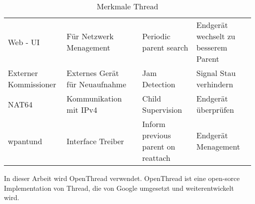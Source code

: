\begin{table}[H]
\begin{adjustbox}{width=1\textwidth}
\begin{tabular}{@{}lllll@{}}
		\multicolumn{1}{|l|}{Web - UI}              & \multicolumn{1}{l|}{Für Netzwerk Menagement}           & \multicolumn{1}{l|}{} & \multicolumn{1}{l|}{Periodic parent search}             & \multicolumn{1}{l|}{Endgerät wechselt zu besserem Parent} \\ \cmidrule(r){1-2} \cmidrule(l){4-5} 
		\multicolumn{1}{|l|}{Externer Kommissioner} & \multicolumn{1}{l|}{Externes Gerät für Neuaufnahme}    & \multicolumn{1}{l|}{} & \multicolumn{1}{l|}{Jam Detection}                      & \multicolumn{1}{l|}{Signal Stau verhindern}               \\ \cmidrule(r){1-2} \cmidrule(l){4-5} 
		\multicolumn{1}{|l|}{NAT64}                 & \multicolumn{1}{l|}{Kommunikation mit IPv4}            & \multicolumn{1}{l|}{} & \multicolumn{1}{l|}{Child Supervision}                  & \multicolumn{1}{l|}{Endgerät überprüfen}                  \\ \cmidrule(r){1-2} \cmidrule(l){4-5} 
		\multicolumn{1}{|l|}{wpantund}              & \multicolumn{1}{l|}{Interface Treiber}                 & \multicolumn{1}{l|}{} & \multicolumn{1}{l|}{Inform previous parent on reattach} & \multicolumn{1}{l|}{Endgerät Menagement}                  \\ \cmidrule(r){1-2} \cmidrule(l){4-5} 
	\end{tabular}
	\end{adjustbox}
	\caption{Merkmale Thread}
	\label{table:MerkmaleThread}
\end{table}

	

	


In dieser Arbeit wird OpenThread verwendet. OpenThread ist eine open-sorce Implementation von Thread, die von Google umgesetzt und weiterentwickelt wird. 

